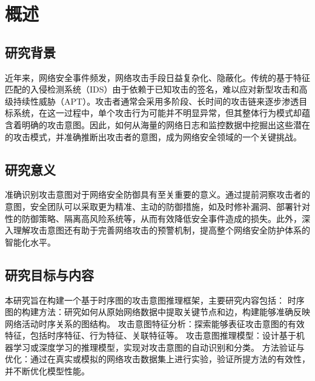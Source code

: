 \documentclass{article} %
\title{\centering{\textbf{基于时序图的攻击意图推理研究}}}
\author{\centering \textbf{220110803 覃煜淮}}
\begin{document}
	
	
	\maketitle
	
	\begin{abstract}
		随着网络攻击技术的不断演进，攻击者的行为模式日益复杂且隐蔽。传统的网络入侵检测技术往往只能被动地识别已知攻击特征，而在面对未知攻击或复杂攻击链时表现出明显的局限性。本文研究了基于时序图的攻击意图推理方法，旨在通过构建和分析网络活动的时序图，挖掘潜在的攻击模式和意图。通过结合图挖掘技术、机器学习算法以及安全领域知识，提出了一种能够主动识别攻击意图的智能推理系统，并在实际数据集上验证了该方法的有效性。
	\end{abstract}
	
	\section{概述}
	
	\subsection{研究背景}
	
	近年来，网络安全事件频发，网络攻击手段日益复杂化、隐蔽化。传统的基于特征匹配的入侵检测系统（IDS）由于依赖于已知攻击的签名，难以应对新型攻击和高级持续性威胁（APT）。攻击者通常会采用多阶段、长时间的攻击链来逐步渗透目标系统，在这一过程中，单个攻击行为可能并不明显异常，但其整体行为模式却蕴含着明确的攻击意图。因此，如何从海量的网络日志和监控数据中挖掘出这些潜在的攻击模式，并准确推断出攻击者的意图，成为网络安全领域的一个关键挑战。
	
	\subsection{研究意义}
	
	准确识别攻击意图对于网络安全防御具有至关重要的意义。通过提前洞察攻击者的意图，安全团队可以采取更为精准、主动的防御措施，如及时修补漏洞、部署针对性的防御策略、隔离高风险系统等，从而有效降低安全事件造成的损失。此外，深入理解攻击意图还有助于完善网络攻击的预警机制，提高整个网络安全防护体系的智能化水平。
	
	\subsection{研究目标与内容}
	
	本研究旨在构建一个基于时序图的攻击意图推理框架，主要研究内容包括：
	时序图的构建方法：研究如何从原始网络数据中提取关键节点和边，构建能够准确反映网络活动时序关系的图结构。
	攻击意图特征分析：探索能够表征攻击意图的有效特征，包括时序特征、行为特征、关联特征等。
	攻击意图推理模型：设计基于机器学习或深度学习的推理模型，实现对攻击意图的自动识别和分类。
	方法验证与优化：通过在真实或模拟的网络攻击数据集上进行实验，验证所提方法的有效性，并不断优化模型性能\citep{Zhang2022}。
	
\end{document}
